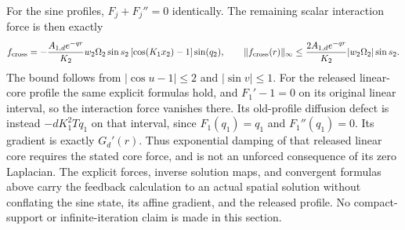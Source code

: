 For the sine profiles, $F_j+F_j''=0$ identically. The remaining
scalar interaction force is then exactly
\[
 f_{\rm cross}=-\frac{A_{1,d}e^{-qr}}{K_2}
   w_2\Omega_2\sin s_2\,[\cos(K_1x_2)-1]\sin(q_2),
 \qquad
 \|f_{\rm cross}(r)\|_\infty
 \leq\frac{2A_{1,d}e^{-qr}}{K_2}|w_2\Omega_2|\sin s_2.
\]
The bound follows from $|\cos u-1|\leq2$ and $|\sin v|\leq1$.
For the released linear-core profile the same explicit formulas hold,
and $F_1'-1=0$ on its original linear interval, so the interaction
force vanishes there. Its old-profile diffusion defect is instead
$-dK_1^2Tq_1$ on that interval, since $F_1(q_1)=q_1$ and
$F_1''(q_1)=0$. Its gradient is exactly $G_d'(r)$.
Thus exponential damping of that released linear core requires the
stated core force, and is not an unforced consequence of its zero
Laplacian. The explicit forces, inverse solution maps, and convergent
formulas above carry the feedback calculation to an actual spatial
solution without conflating the sine state, its affine gradient, and
the released profile. No compact-support or infinite-iteration claim
is made in this section.
